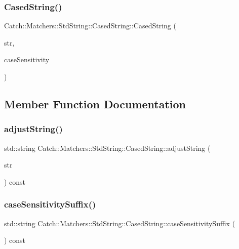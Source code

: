 \subsubsection{\texorpdfstring{CasedString()}{CasedString()}}
{\footnotesize\ttfamily Catch\+::\+Matchers\+::\+Std\+String\+::\+Cased\+String\+::\+Cased\+String (\begin{DoxyParamCaption}\item[{std\+::string const \&}]{str,  }\item[{\mbox{\hyperlink{struct_catch_1_1_case_sensitive_aad49d3aee2d97066642fffa919685c6a}{Case\+Sensitive\+::\+Choice}}}]{case\+Sensitivity }\end{DoxyParamCaption})}



\subsection{Member Function Documentation}
\mbox{\label{struct_catch_1_1_matchers_1_1_std_string_1_1_cased_string_a77639b1165c01f424ee0e96f53335010}} 
\subsubsection{\texorpdfstring{adjustString()}{adjustString()}}
{\footnotesize\ttfamily std\+::string Catch\+::\+Matchers\+::\+Std\+String\+::\+Cased\+String\+::adjust\+String (\begin{DoxyParamCaption}\item[{std\+::string const \&}]{str }\end{DoxyParamCaption}) const}

\mbox{\label{struct_catch_1_1_matchers_1_1_std_string_1_1_cased_string_a9759155344d696b2476d764a1d95fcc9}} 
\subsubsection{\texorpdfstring{caseSensitivitySuffix()}{caseSensitivitySuffix()}}
{\footnotesize\ttfamily std\+::string Catch\+::\+Matchers\+::\+Std\+String\+::\+Cased\+String\+::case\+Sensitivity\+Suffix (\begin{DoxyParamCaption}{ }\end{DoxyParamCaption}) const}



